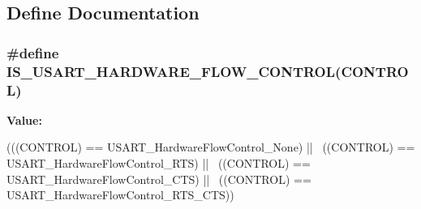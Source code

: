 \subsection{Define Documentation}
\hypertarget{group__USART__Hardware__Flow__Control_ga9b905eb465780173a2e98bc8b602c030}{
\subsubsection[{IS\_\-USART\_\-HARDWARE\_\-FLOW\_\-CONTROL}]{\setlength{\rightskip}{0pt plus 5cm}\#define IS\_\-USART\_\-HARDWARE\_\-FLOW\_\-CONTROL(CONTROL)}}
\label{group__USART__Hardware__Flow__Control_ga9b905eb465780173a2e98bc8b602c030}
{\bfseries Value:}
\begin{DoxyCode}
(((CONTROL) == USART_HardwareFlowControl_None) || \
                               ((CONTROL) == USART_HardwareFlowControl_RTS) || \
                               ((CONTROL) == USART_HardwareFlowControl_CTS) || \
                               ((CONTROL) == USART_HardwareFlowControl_RTS_CTS))
\end{DoxyCode}
